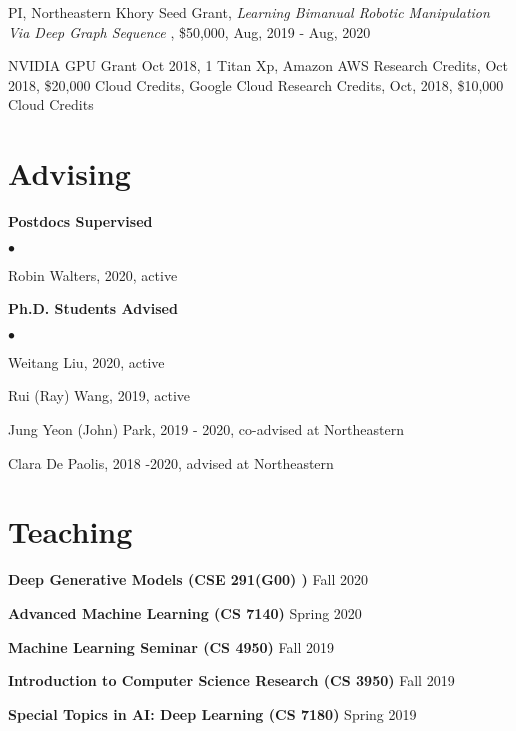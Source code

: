 \documentclass[margin,line]{res}
\newenvironment{list2}{
  \begin{list}{$\bullet$}{%
      \setlength{\itemsep}{0in}
      \setlength{\parsep}{0in} \setlength{\parskip}{0in}
      \setlength{\topsep}{0in} \setlength{\partopsep}{0in} 
      \setlength{\leftmargin}{0.2in}}}{\end{list}}
\begin{document}
\begin{resume}
\begin{enumerate}[label={[G\arabic*]}]
\item PI, Northeastern Khory Seed Grant, \textit{Learning Bimanual Robotic Manipulation Via Deep Graph Sequence }, \$50,000,  Aug, 2019 - Aug, 2020	

\item NVIDIA GPU Grant Oct 2018, 1  Titan Xp,  Amazon AWS Research Credits, Oct  2018, \$20,000 Cloud Credits, Google Cloud Research Credits, Oct, 2018, \$10,000 Cloud Credits

\end{enumerate} 



\section{\sc Advising }
{\bf Postdocs Supervised} \\


\begin{list2}
\item Robin Walters, 2020, active 
\end{list2}




{\bf Ph.D. Students Advised} \\

\begin{list2}
\item Weitang Liu, 2020, active
\item Rui (Ray) Wang, 2019, active 
\item Jung Yeon (John) Park, 2019 - 2020,  co-advised at Northeastern
\item Clara De Paolis, 2018 -2020,  advised at Northeastern
\end{list2}


 

\section{\sc Teaching }
 {\bf Deep Generative Models  (CSE 291(G00) )}   \hfill  {Fall 2020} 



 {\bf Advanced Machine Learning  (CS 7140)}   \hfill  { Spring 2020} 


 {\bf Machine Learning Seminar (CS 4950)}   \hfill  { Fall 2019} 

 {\bf Introduction to Computer Science Research (CS 3950)}   \hfill  { Fall 2019} 
 
 {\bf Special Topics in AI: Deep Learning (CS 7180)}   \hfill  { Spring 2019} 



\end{resume}
\end{document}
